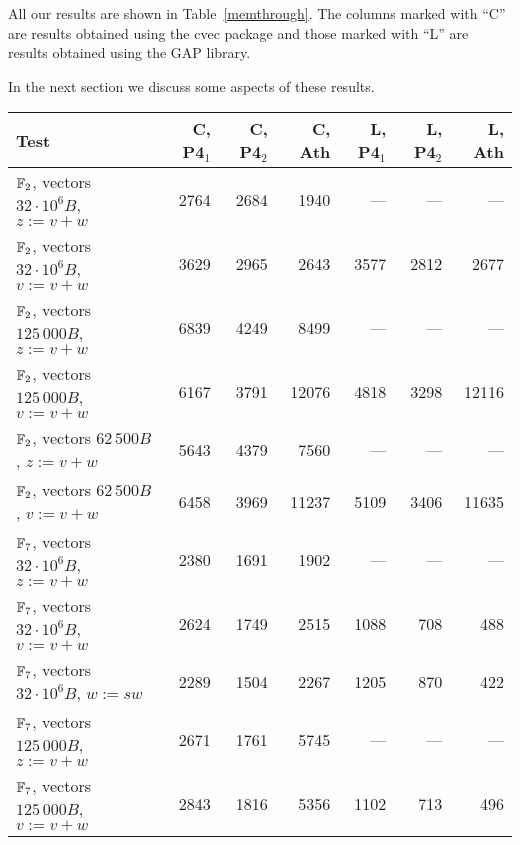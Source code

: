 All our results are shown in Table~\ref{memthrough}. The columns marked
with ``C'' are results obtained using the {\sf cvec} package and those 
marked with ``L'' are results obtained using the {\sf GAP} library.

In the next section we discuss some aspects of these results.

\begin{table}[ht]
\begin{center}
\begin{tabular}{|l|r|r|r|r|r|r|}
\hline
Test            & C, P4$_1$ & C, P4$_2$ & C, Ath & 
                  L, P4$_1$  & L, P4$_2$  & L, Ath \\
\hline
\hline
$\mathbb{F}_2$, vectors $32\cdot 10^6 B$, $z := v+w$ 
& 2764 & 2684 & 1940 & ---  & --- & --- \\
\hline                                                    
$\mathbb{F}_2$, vectors $32\cdot 10^6 B$, $v := v+w$ 
& 3629 & 2965 & 2643 & 3577 & 2812 & 2677 \\
\hline                                                    
$\mathbb{F}_2$, vectors $125\,000 B$, $z := v+w$     
& 6839 & 4249 & 8499 & ---  & --- & --- \\
\hline                                                    
$\mathbb{F}_2$, vectors $125\,000 B$, $v := v+w$     
& 6167 & 3791 &12076 & 4818 & 3298 & 12116 \\
\hline                                                    
$\mathbb{F}_2$, vectors $62\,500 B$, $z := v+w$      
& 5643 & 4379 & 7560 & ---  & --- & --- \\
\hline
$\mathbb{F}_2$, vectors $62\,500 B$, $v := v+w$      
& 6458 & 3969 &11237 & 5109 & 3406 &11635 \\
\hline                                                    
\hline
$\mathbb{F}_7$, vectors $32\cdot 10^6 B$, $z := v+w$ 
& 2380 & 1691 & 1902 & ---  & --- & --- \\
\hline
$\mathbb{F}_7$, vectors $32\cdot 10^6 B$, $v := v+w$ 
& 2624 & 1749 & 2515 & 1088 & 708 & 488  \\
\hline                                                    
$\mathbb{F}_7$, vectors $32\cdot 10^6 B$, $w := sw$  
& 2289 & 1504 & 2267 & 1205 & 870 & 422  \\
\hline                                                    
$\mathbb{F}_7$, vectors $125\,000 B$, $z := v+w$     
& 2671 & 1761 & 5745 & ---  & --- & --- \\
\hline
$\mathbb{F}_7$, vectors $125\,000 B$, $v := v+w$     
& 2843 & 1816 & 5356 & 1102 & 713 & 496  \\
\hline                                                    

\end{tabular}
\end{center}
\end{table}
